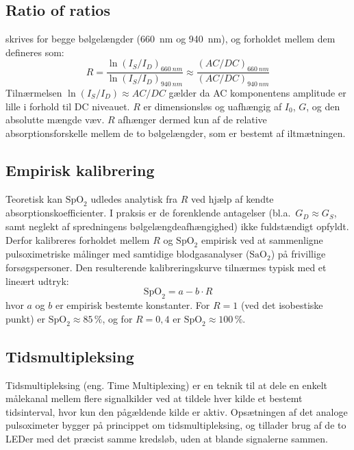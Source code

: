 \subsection{Ratio of ratios}
\label{sec:ratio_of_ratios}
 skrives for begge bølgelængder (\SI{660}{nm} og \SI{940}{nm}), og forholdet mellem dem defineres som:
\begin{equation}
    R = \frac{\ln(I_S / I_D)_{\SI{660}{nm}}}{\ln(I_S / I_D)_{\SI{940}{nm}}} 
    \approx \frac{(AC/DC)_{\SI{660}{nm}}}{(AC/DC)_{\SI{940}{nm}}}
    \label{eq:ratio_of_ratios}
\end{equation}
Tilnærmelsen $\ln(I_S/I_D) \approx AC/DC$ gælder da AC komponentens amplitude er lille i forhold til DC niveauet. $R$ er dimensionsløs og uafhængig af $I_0$, $G$, og den absolutte mængde væv. $R$ afhænger dermed kun af de relative absorptionsforskelle mellem de to bølgelængder, som er bestemt af iltmætningen.

\subsection{Empirisk kalibrering}
Teoretisk kan $\text{SpO}_2$ udledes analytisk fra $R$ ved hjælp af kendte absorptionskoefficienter. I praksis er de forenklende antagelser (bl.a.\ $G_D \approx G_S$, samt neglekt af spredningens bølgelængdeafhængighed) ikke fuldstændigt opfyldt. Derfor kalibreres forholdet mellem $R$ og $\text{SpO}_2$ empirisk ved at sammenligne pulsoximetriske målinger med samtidige blodgasanalyser ($\text{SaO}_2$) på frivillige forsøgspersoner. Den resulterende kalibreringskurve tilnærmes typisk med et lineært udtryk:
\begin{equation}
    \text{SpO}_2 = a - b \cdot R
    \label{eq:spo2_calibration}
\end{equation}
hvor $a$ og $b$ er empirisk bestemte konstanter. For $R = 1$ (ved det isobestiske punkt) er $\text{SpO}_2 \approx 85\,\%$, og for $R = 0{,}4$ er $\text{SpO}_2 \approx 100\,\%$.


\subsection{Tidsmultipleksing}


Tidsmultipleksing (eng. Time Multiplexing) er en teknik til at dele en enkelt målekanal mellem flere signalkilder ved at tildele hver kilde et bestemt tidsinterval, hvor kun den pågældende kilde er aktiv. Opsætningen af det analoge pulsoximeter bygger på princippet om tidsmultipleksing, og tillader brug af de to LEDer med det præcist samme kredsløb, uden at blande signalerne sammen.

